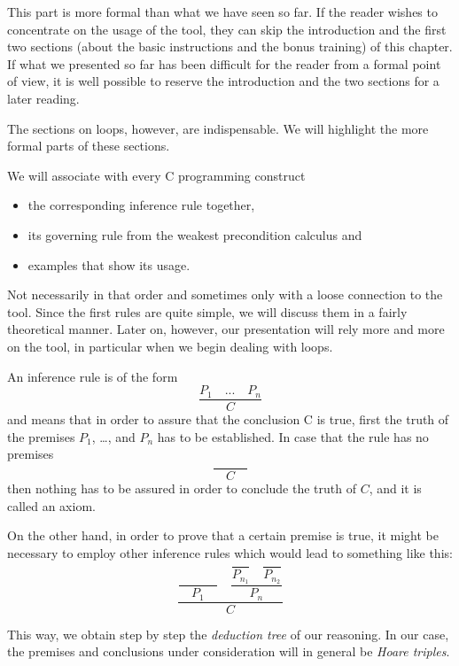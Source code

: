 \begin{Information}
  This part is more formal than what we have seen so far. If the reader
  wishes to concentrate on the usage of the tool, they can skip the
  introduction and the first two sections (about the basic instructions
  and the bonus training) of this chapter. If what we presented so far has
  been difficult for the reader from a formal point of view,
  it is well possible to reserve the introduction and the two
  sections for a later reading.

  The sections on loops, however, are indispensable. We will highlight
  the more formal parts of these sections.
\end{Information}


We will associate with every C programming construct

\begin{itemize}
\item the corresponding inference rule together,
\item its governing rule from the weakest precondition calculus and
\item examples that show its usage.
\end{itemize}

Not necessarily in that order and sometimes only with a loose connection
to the tool. Since the first rules are quite simple, we will discuss
them in a fairly theoretical manner. Later on, however, our presentation
will rely more and more on the tool, in particular when we begin dealing
with loops.





An inference rule is of the form
$$\dfrac{P_1 \quad ... \quad P_n}{C}$$
and means that in order to assure that the conclusion C is true, first
the truth of the premises $P_1$, \ldots{}, and $P_n$ has to be
established. In case that the rule has no premises
$$\dfrac{}{\quad C \quad}$$
then nothing has to be assured in order to conclude the truth of $C$,
and it is called an axiom.

On the other hand, in order to prove that a certain premise is true, it
might be necessary to employ other inference rules which would lead to
something like this:
$$\dfrac{\dfrac{}{\quad P_1\quad} \quad \dfrac{\dfrac{}{P_{n_1}}\quad \dfrac{}{P_{n_2}}}{P_n}}{C}$$

This way, we obtain step by step the \emph{deduction tree} of our
reasoning. In our case, the premises and conclusions under consideration
will in general be \emph{Hoare triples}.




